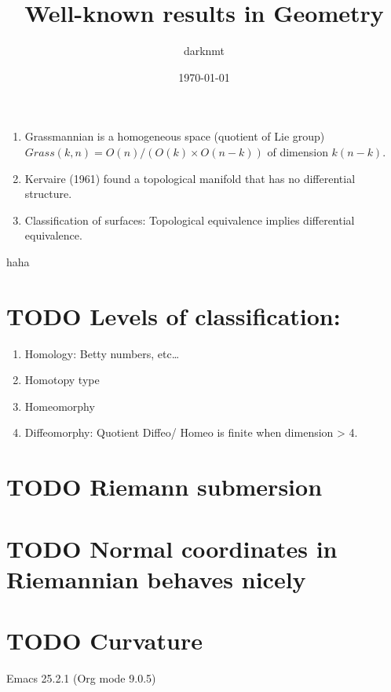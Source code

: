\documentclass[11pt]{article}
\author{darknmt}
\date{\today}
\title{Well-known results in Geometry}
\begin{document}
\maketitle
\tableofcontents

\begin{enumerate}
\item Grassmannian is a homogeneous space (quotient of Lie group) \(Grass(k,n) = O(n)/(O(k)\times
   O(n-k))\) of dimension \(k(n-k)\).
\item Kervaire (1961) found a topological manifold that has no differential structure.
\item Classification of surfaces: Topological equivalence implies differential equivalence.
\end{enumerate}

haha
\section{{\bfseries\sffamily TODO} Levels of classification:}
\label{sec:org1b0664a}
\begin{enumerate}
\item Homology: Betty numbers, etc\ldots{}
\item Homotopy type
\item Homeomorphy
\item Diffeomorphy: Quotient Diffeo/ Homeo is finite when dimension > 4.
\end{enumerate}


\section{{\bfseries\sffamily TODO} Riemann submersion}
\label{sec:org926efe4}

\section{{\bfseries\sffamily TODO} Normal coordinates in Riemannian behaves nicely}
\label{sec:orge638ce8}

\section{{\bfseries\sffamily TODO} Curvature}
\label{sec:org20c4b49}
Emacs 25.2.1 (Org mode 9.0.5)
\end{document}
